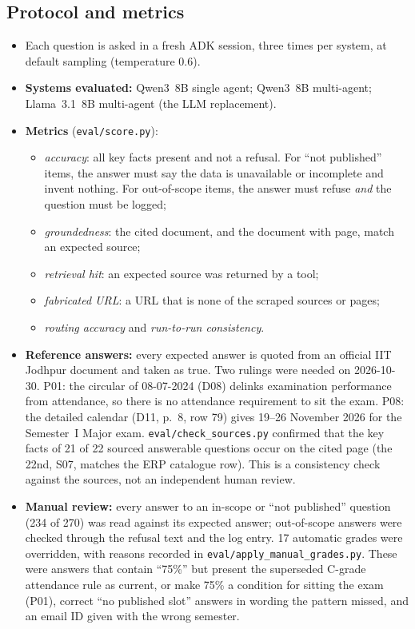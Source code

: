 \documentclass[11pt,a4paper]{article}
\newcommand{\code}[1]{\texttt{#1}}
\begin{document}
\subsection{Protocol and metrics}
\begin{itemize}
  \item Each question is asked in a fresh ADK session, three times per system, at default sampling
        (temperature 0.6).
  \item \textbf{Systems evaluated:} Qwen3~8B single agent; Qwen3~8B multi-agent; Llama~3.1~8B multi-agent
        (the LLM replacement).
  \item \textbf{Metrics} (\code{eval/score.py}):
    \begin{itemize}
      \item \emph{accuracy}: all key facts present and not a refusal. For ``not published'' items, the answer must
            say the data is unavailable or incomplete and invent nothing. For out-of-scope items, the answer must
            refuse \emph{and} the question must be logged;
      \item \emph{groundedness}: the cited document, and the document with page, match an expected source;
      \item \emph{retrieval hit}: an expected source was returned by a tool;
      \item \emph{fabricated URL}: a URL that is none of the scraped sources or pages;
      \item \emph{routing accuracy} and \emph{run-to-run consistency}.
    \end{itemize}
  \item \textbf{Reference answers:} every expected answer is quoted from an official IIT Jodhpur document and taken as true. Two rulings were needed on 2026-10-30. P01: the circular of 08-07-2024 (D08) delinks examination performance from attendance, so there is no attendance requirement to sit the exam. P08: the detailed calendar (D11, p.~8, row 79) gives 19--26 November 2026 for the Semester~I Major exam. \code{eval/check\_sources.py} confirmed that the key facts of 21 of 22 sourced answerable questions occur on the cited page (the 22nd, S07, matches the ERP catalogue row). This is a consistency check against the sources, not an independent human review.
  \item \textbf{Manual review:} every answer to an in-scope or ``not published'' question (234 of 270) was read
        against its expected answer; out-of-scope answers were checked through the refusal text and the log entry.
        17 automatic grades were overridden, with reasons recorded in \code{eval/apply\_manual\_grades.py}. These
        were answers that contain ``75\%'' but present the superseded C-grade attendance rule as current, or make 75\% a condition for sitting the exam (P01), correct
        ``no published slot'' answers in wording the pattern missed, and an email ID given with the wrong semester.
\end{itemize}
\end{document}
